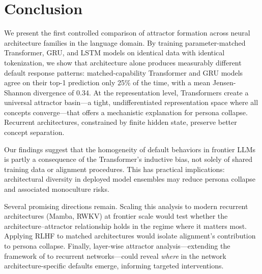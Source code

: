 \section{Conclusion}
\label{sec:conclusion}

We present the first controlled comparison of attractor formation across neural architecture families in the language domain. By training parameter-matched Transformer, GRU, and LSTM models on identical data with identical tokenization, we show that architecture alone produces measurably different default response patterns: matched-capability Transformer and GRU models agree on their top-1 prediction only 25\% of the time, with a mean Jensen-Shannon divergence of 0.34. At the representation level, Transformers create a universal attractor basin---a tight, undifferentiated representation space where all concepts converge---that offers a mechanistic explanation for persona collapse. Recurrent architectures, constrained by finite hidden state, preserve better concept separation.

Our findings suggest that the homogeneity of default behaviors in frontier LLMs is partly a consequence of the Transformer's inductive bias, not solely of shared training data or alignment procedures. This has practical implications: architectural diversity in deployed model ensembles may reduce persona collapse and associated monoculture risks.

Several promising directions remain. Scaling this analysis to modern recurrent architectures (Mamba, RWKV) at frontier scale would test whether the architecture--attractor relationship holds in the regime where it matters most. Applying RLHF to matched architectures would isolate alignment's contribution to persona collapse. Finally, layer-wise attractor analysis---extending the framework of \citet{chytas2025concept} to recurrent networks---could reveal \emph{where} in the network architecture-specific defaults emerge, informing targeted interventions.
